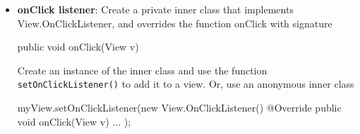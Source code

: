 \documentclass{report}
\begin{document}
\begin{itemize}
\begin{javacode}
{                    public void afterTextChanged(Editable e)
                }
            \end{javacode}
            Where (\texttt{beforeTextChanged})
            \begin{itemize}
                \item \textbf{CharSequence s}: The text before the change.
                \item \textbf{int start}: The position (index) in the text where the change will begin.
                \item \textbf{int count}: How many characters are about to be replaced (i.e., how many will be removed).
                \item \textbf{int after}: How many characters will replace the old ones (i.e., how many will be added).
            \end{itemize}
            (onTextChanged)
            \begin{itemize}
                \item \textbf{CharSequence s}: The text after the change (current state).
                \item \textbf{int start}: The position in the text where the change happened.
                \item \textbf{int before}: Number of characters that were replaced (removed).
                \item \textbf{int count}: Number of new characters added.
            \end{itemize}
            \bigbreak \noindent 
            (afterTextChanged)
            \begin{itemize}
                \item \textbf{Editable:}  Represents the text content of the EditText after a change has occurred.
            \end{itemize}
            \bigbreak \noindent 
            Instantiate an instance of the class and attach it to a view with \texttt{.addTextChangedListener()}

        \item \textbf{onClick listener}: Create a private inner class that implements View.OnClickListener, and overrides the function onClick with signature
            \bigbreak \noindent 
            \begin{javacode}
            public void onClick(View v)
            \end{javacode}
            \bigbreak \noindent 
            Create an instance of the inner class and use the function \texttt{setOnClickListener()} to add it to a view.
            \bigbreak \noindent 
            Or, use an anonymous inner class
            \bigbreak \noindent 
            \begin{javacode}
                myView.setOnClickListener(new View.OnClickListener() {
                    @Override
                    public void onClick(View v) {
                        ...
                    }
                });
            \end{javacode}

    \end{itemize}
\end{document}
